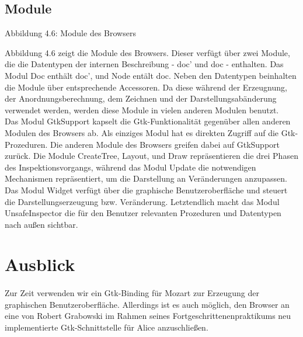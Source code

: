 \documentclass[12pt,a4paper]{article}
\begin{document}
\subsection{Module}

\begin{center}
\linebreak Abbildung 4.6: Module des Browsers
\end{center}

Abbildung 4.6 zeigt die Module des Browsers.
Dieser verf\"{u}gt \"{u}ber zwei Module, die 
die Datentypen der internen Beschreibung  - doc' und doc - enthalten.
Das Modul Doc enth\"alt doc', und Node ent\"alt doc.
Neben den Datentypen beinhalten die Module \"{u}ber 
entsprechende Accessoren.
Da diese w\"{a}hrend der 
Erzeugnung, der Anordnungsberechnung, dem Zeichnen 
und der Darstellungsab\"{a}nderung verwendet werden, 
werden diese Module in vielen anderen Modulen benutzt.\\
Das Modul GtkSupport kapselt die Gtk-Funktionalit\"{a}t 
gegen\"{u}ber allen anderen Modulen des Browsers ab. 
Als einziges Modul hat es direkten Zugriff auf die 
Gtk-Prozeduren. Die anderen Module des Browsers 
greifen dabei auf GtkSupport zur\"{u}ck.
Die Module CreateTree, Layout, und Draw repr\"{a}sentieren 
die drei Phasen des Inspektionsvorgangs, w\"ahrend das Modul 
Update die notwendigen Mechanismen repr\"asentiert, 
um die Darstellung an Ver\"{a}nderungen anzupassen. 
Das Modul Widget verf\"{u}gt \"{u}ber die 
graphische Benutzeroberfl\"{a}che und steuert 
die Darstellungserzeugung bzw. Ver\"{a}nderung. 
Letztendlich macht das Modul UnsafeInspector die f\"{u}r den 
Benutzer relevanten Prozeduren und Datentypen nach au\ss en sichtbar.



\section{Ausblick}

\paragraph{}

Zur Zeit verwenden wir ein Gtk-Binding f\"ur Mozart \cite{mo:mo}
zur Erzeugung der graphischen Benutzeroberfl\"ache. Allerdings ist 
es auch m\"oglich, den Browser an eine von Robert Grabowski im Rahmen 
seines Fortgeschrittenenpraktikums neu implementierte Gtk-Schnittstelle
f\"ur Alice \cite{gr:gt} anzuschlie\ss en.
\end{document}
